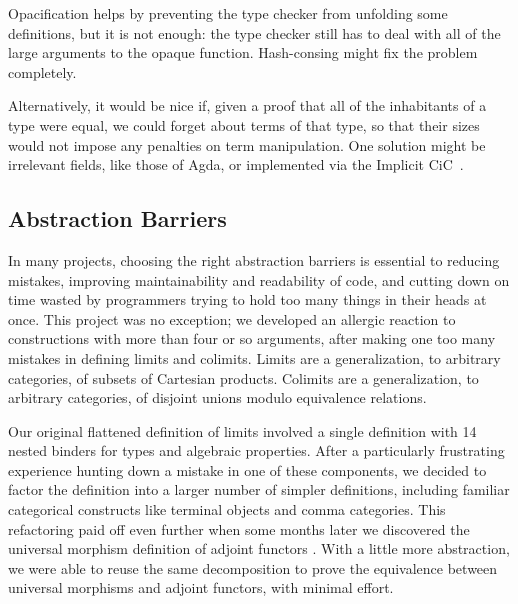 \documentclass[runningheads]{llncs}
\begin{document}
    Opacification helps by preventing the type checker from unfolding some definitions, but it is not enough: the type checker still has to deal with all of the large arguments to the opaque function.  Hash-consing might fix the problem completely.

    Alternatively, it would be nice if, given a proof that all of the inhabitants of a type were equal, we could forget about terms of that type, so that their sizes would not impose any penalties on term manipulation.  %
    One solution might be irrelevant fields, like those of Agda, or implemented via the Implicit CiC~\cite{barras2008implicit,logical2001implicit}.

  \subsection{Abstraction Barriers} \label{sec:abstraction-barriers}

    In many projects, choosing the right abstraction barriers is essential to reducing mistakes, improving maintainability and readability of code, and cutting down on time wasted by programmers trying to hold too many things in their heads at once.  This project was no exception; we developed an allergic reaction to constructions with more than four or so arguments, after making one too many mistakes in defining limits and colimits.  Limits are a generalization, to arbitrary categories, of subsets of Cartesian products.  Colimits are a generalization, to arbitrary categories, of disjoint unions modulo equivalence relations.

    Our original flattened definition of limits involved a single definition with 14 nested binders for types and algebraic properties.  After a particularly frustrating experience hunting down a mistake in one of these components, we decided to factor the definition into a larger number of simpler definitions, including familiar categorical constructs like terminal objects and comma categories.  This refactoring paid off even further when some months later we discovered the universal morphism definition of adjoint functors%
    .  With a little more abstraction, we were able to reuse the same decomposition to prove the equivalence between universal morphisms and adjoint functors, with minimal effort.
\end{document}
